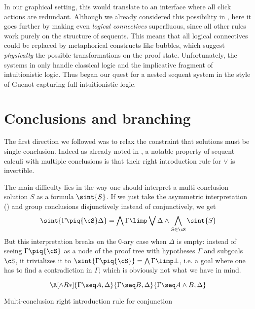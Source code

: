 In our graphical setting, this would translate to an interface where all click
actions are redundant. Although we already considered this possibility in
, here it goes further by making even \emph{logical
connectives} superfluous, since all other rules work purely on the structure of
sequents. This means that all logical connectives could be replaced by
metaphorical constructs like bubbles, which suggest \emph{physically} the
possible transformations on the proof state. Unfortunately, the systems in
\cite{guenot_nested_2013} only handle classical logic and the implicative
fragment of intuitionistic logic. Thus began our quest for a nested sequent
system in the style of Guenot capturing full intuitionistic logic.


\section{Conclusions and branching}

The first direction we followed was to relax the constraint that solutions must
be single-conclusion. Indeed as already noted in , a
notable property of sequent calculi with multiple conclusions is that their
right introduction rule for $\lor$ is invertible.

The main difficulty lies in the way one should interpret a multi-conclusion
solution $S$ as a formula $\sint{S}$. If we just take the asymmetric
interpretation () and group conclusions disjunctively instead of
conjunctively, we get
$$
\sint{\Gamma \piq{\cS} \Delta} =
\bigwedge \Gamma \limp \bigvee \Delta \land \bigwedge_{S \in \cS}{\sint{S}}
$$
But this interpretation breaks on the 0-ary case when $\Delta$ is empty: instead
of seeing $\Gamma \piq{\cS}$ as a node of the proof tree with hypotheses
$\Gamma$ and subgoals $\cS$, it trivializes it to $\sint{\Gamma
\piq{\cS}} = \bigwedge \Gamma \limp \bot$, i.e. a goal where one has to
find a contradiction in $\Gamma$; which is obviously not what we have in mind.

\begin{marginfigure}
  $$
  \R[\land R*]
    {\Gamma \seq A, \Delta}
    {\Gamma \seq B, \Delta}
    {\Gamma \seq A \land B, \Delta}
  $$
  \caption{Multi-conclusion right introduction rule for conjunction}
\end{marginfigure}

